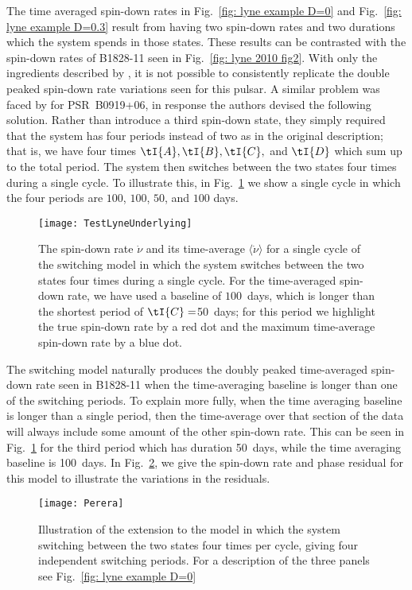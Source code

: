 The time averaged spin-down rates in Fig.~\ref{fig: lyne example D=0} and
Fig.~\ref{fig: lyne example D=0.3} result from having two spin-down rates and
two durations which the system spends in those states. These results can be
contrasted with the spin-down rates of B1828-11 seen in Fig.~\ref{fig: lyne
2010 fig2}.  With only the ingredients described by \citet{Lyne2010}, it is not
possible to consistently replicate the double peaked spin-down rate variations
seen for this pulsar. A similar problem was faced by \citet{Perera2014} for
PSR~B0919+06, in response the authors devised the following solution. Rather
than introduce a third spin-down state, they simply required that the system
has four periods instead of two as in the original \citet{Lyne2010}
description; that is, we have four times $\tI{A}, \tI{B}, \tI{C},$ and $\tI{D}$
which sum up to the total period.
The system then switches between the two states four times during
a single cycle.  To illustrate this, in Fig.~\ref{fig: test lyne underlying} we
show a single cycle in which the four periods are $100$, $100$, $50$, and $100$
days.
\begin{figure}[htb]
    \centering
    \texttt{[image: TestLyneUnderlying]}
    \caption{The spin-down rate $\dot{\nu}$ and its time-average $\langle\dot{\nu}\rangle$
    for a single cycle of the \citet{Perera2014} switching model in which the
    system switches between the two states four times during a single cycle.
    For the time-averaged spin-down rate, we have used a baseline of $100$~days,
    which is longer than the shortest period of $\tI{C}=$50~days; for this period we
    highlight the true spin-down rate by a red dot and the maximum time-average
    spin-down rate by a blue dot.}
    \label{fig: test lyne underlying}
\end{figure}

The \citet{Perera2014} switching model naturally produces the doubly peaked
time-averaged spin-down rate seen in B1828-11 when the time-averaging baseline is longer
than one of the switching periods. To explain more fully, when the time
averaging baseline is longer than a single period, then the time-average over
that section of the data will always include some amount of the other spin-down
rate. This can be seen in Fig.~\ref{fig: test lyne underlying} for the third
period which has duration 50~days, while the time averaging baseline is
100~days. In Fig.~\ref{fig: perera example}, we give the spin-down rate and
phase residual for this model to illustrate the variations in the residuals.
\begin{figure}[htb]
    \centering
    \texttt{[image: Perera]}
    \caption{Illustration of the \citet{Perera2014} extension to the
    \citet{Lyne2010} model in which the system switching between the two states
    four times per cycle, giving four independent switching periods. For a description
    of the three panels see Fig.~\ref{fig: lyne example D=0}}
    \label{fig: perera example}
\end{figure}

